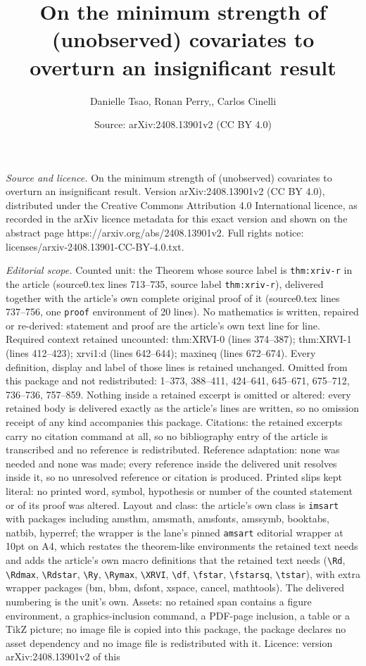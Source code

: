 \documentclass[10pt,a4paper]{amsart}
\title[On the minimum strength of (unobserved) covariates to overtu]{On the minimum strength of (unobserved) covariates to overturn an insignificant result}
\author{Danielle Tsao, Ronan Perry,, Carlos Cinelli}
\date{Source: arXiv:2408.13901v2 (CC BY 4.0)}
\begin{document}
\maketitle

\noindent\emph{Source and licence.} On the minimum strength of (unobserved) covariates to overturn an insignificant result. Version arXiv:2408.13901v2 (CC BY 4.0), distributed under the Creative Commons Attribution 4.0 International licence, as recorded in the arXiv licence metadata for this exact version and shown on the abstract page https://arxiv.org/abs/2408.13901v2. Full rights notice: licenses/arxiv-2408.13901-CC-BY-4.0.txt.\par\smallskip

\noindent\textit{Editorial scope.} Counted unit: the Theorem whose source label is \texttt{thm:xriv-r} in the article (source0.tex lines 713--735, source label \texttt{thm:xriv-r}), delivered together with the article's own complete original proof of it (source0.tex lines 737--756, one \texttt{proof} environment of 20 lines). No mathematics is written, repaired or re-derived: statement and proof are the article's own text line for line. Required context retained uncounted: thm:XRVI-0 (lines 374--387); thm:XRVI-1 (lines 412--423); xrvi1:d (lines 642--644); maxineq (lines 672--674). Every definition, display and label of those lines is retained unchanged. Omitted from this package and not redistributed: 1--373, 388--411, 424--641, 645--671, 675--712, 736--736, 757--859. Nothing inside a retained excerpt is omitted or altered: every retained body is delivered exactly as the article's lines are written, so no omission receipt of any kind accompanies this package. Citations: the retained excerpts carry no citation command at all, so no bibliography entry of the article is transcribed and no reference is redistributed. Reference adaptation: none was needed and none was made; every reference inside the delivered unit resolves inside it, so no unresolved reference or citation is produced. Printed slips kept literal: no printed word, symbol, hypothesis or number of the counted statement or of its proof was altered. Layout and class: the article's own class is \texttt{imsart} with packages including amsthm, amsmath, amsfonts, amssymb, booktabs, natbib, hyperref; the wrapper is the lane's pinned \texttt{amsart} editorial wrapper at 10pt on A4, which restates the theorem-like environments the retained text needs and adds the article's own macro definitions that the retained text needs (\texttt{\textbackslash Rd}, \texttt{\textbackslash Rdmax}, \texttt{\textbackslash Rdstar}, \texttt{\textbackslash Ry}, \texttt{\textbackslash Rymax}, \texttt{\textbackslash XRVI}, \texttt{\textbackslash df}, \texttt{\textbackslash fstar}, \texttt{\textbackslash fstarsq}, \texttt{\textbackslash tstar}), with extra wrapper packages (bm, bbm, dsfont, xspace, cancel, mathtools). The delivered numbering is the unit's own. Assets: no retained span contains a figure environment, a graphics-inclusion command, a PDF-page inclusion, a table or a TikZ picture; no image file is copied into this package, the package declares no asset dependency and no image file is redistributed with it. Licence: version arXiv:2408.13901v2 of this 
\end{document}
